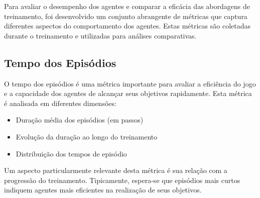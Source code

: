 Para avaliar o desempenho dos agentes e comparar a eficácia das abordagens de treinamento, foi desenvolvido um conjunto abrangente de métricas que captura diferentes aspectos do comportamento dos agentes. Estas métricas são coletadas durante o treinamento e utilizadas para análises comparativas.





\subsection{Tempo dos Episódios}

O tempo dos episódios é uma métrica importante para avaliar a eficiência do jogo e a capacidade dos agentes de alcançar seus objetivos rapidamente. Esta métrica é analisada em diferentes dimensões:

\begin{itemize}
    \item Duração média dos episódios (em passos)
    \item Evolução da duração ao longo do treinamento
    \item Distribuição dos tempos de episódio
\end{itemize}

Um aspecto particularmente relevante desta métrica é sua relação com a progressão do treinamento. Tipicamente, espera-se que episódios mais curtos indiquem agentes mais eficientes na realização de seus objetivos.

